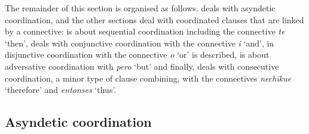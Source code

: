 The remainder of this section is organised as follows.  deals with asyndetic coordination, and the other sections deal with coordinated clauses that are linked by a connective:  is about sequential coordination including the connective \textit{te} ‘then’,  deals with conjunctive coordination with the connective \textit{i} ‘and’, in  disjunctive coordination with the connective \textit{o} ‘or’ is described,  is about adversative coordination with \textit{pero} ‘but’ and finally,  deals with consecutive coordination, a minor type of clause combining, with the connectives \textit{nechikue} ‘therefore’ and \textit{entonses} ‘thus’.

\subsection{Asyndetic coordination}\label{sec:AsyndeticCoordination}








